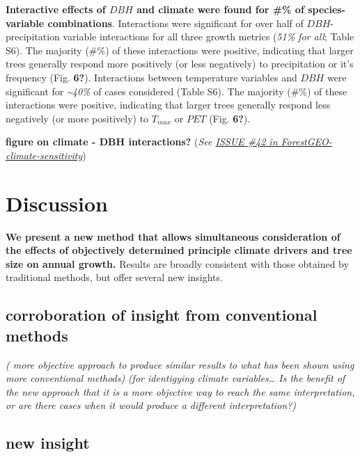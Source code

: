 \documentclass[
]{article}
\begin{document}
\textbf{Interactive effects of \(DBH\) and climate were found for \#\%
of species-variable combinations}. Interactions were significant for
over half of \(DBH\)-precipitation variable interactions for all three
growth metrics (\emph{51\% for all}; Table S6). The majority (\#\%) of
these interactions were positive, indicating that larger trees generally
respond more positively (or less negatively) to precipitation or it's
frequency (Fig. \textbf{6?}). Interactions between temperature variables
and \(DBH\) were significant for \emph{\textasciitilde40\%} of cases
considered (Table S6). The majority (\#\%) of these interactions were
positive, indicating that larger trees generally respond less negatively
(or more positively) to \(T_{max}\) or \(PET\) (Fig. \textbf{6?}).

\textbf{figure on climate - DBH interactions?} (\emph{See
\href{https://github.com/EcoClimLab/ForestGEO-climate-sensitivity/issues/42}{ISSUE
\#42 in ForestGEO-climate-sensitivity}})

\hypertarget{discussion}{%
\section{Discussion}\label{discussion}}

\textbf{We present a new method that allows simultaneous consideration
of the effects of objectively determined principle climate drivers and
tree size on annual growth.} Results are broadly consistent with those
obtained by traditional methods, but offer several new insights.

\hypertarget{corroboration-of-insight-from-conventional-methods}{%
\subsection{corroboration of insight from conventional
methods}\label{corroboration-of-insight-from-conventional-methods}}

\emph{( more objective approach to produce similar results to what has
been shown using more conventional methods)} \emph{(for identigying
climate variables\ldots{} Is the benefit of the new approach that it is
a more objective way to reach the same interpretation, or are there
cases when it would produce a different interpretation?)}

\hypertarget{new-insight}{%
\subsection{new insight}\label{new-insight}}
\end{document}
